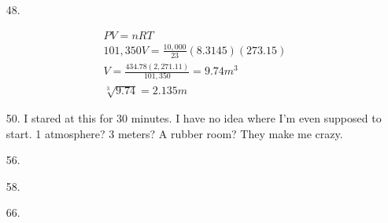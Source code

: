 \documentclass[12pt, letterpaper]{article}
\begin{document}
\begin{enumerate}
        \item [48.] \mbox{}
        
        \begin{mdframed}
            \begin{equation*}
                \begin{gathered}
                    PV = nRT \\
                    101,350V = \frac{10,000}{23}(8.3145)(273.15)    \\
                    V = \frac{434.78(2,271.11)}{101,350} = 9.74m^{3}\\
                    \sqrt[3]{9.74} = \boxed{2.135m}
                \end{gathered}
            \end{equation*}
        \end{mdframed}

        \item [50.] I stared at this for 30 minutes. I have no idea where I'm even supposed to start. 1 atmosphere? 3 meters? A rubber room? They make me crazy.
        \item [56.] 
        \item [58.]
        \item [66.]
    \end{enumerate}
\end{document}
